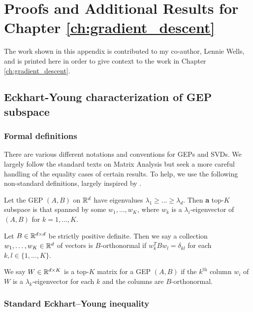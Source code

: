 \graphicspath{{chapters/gradient_descent/}}
\chapter{Proofs and Additional Results for Chapter \ref{ch:gradient_descent}}\label{app:gradient_descent}

The work shown in this appendix is contributed to my co-author, Lennie Wells, and is printed here in order to give context to the work in Chapter \ref{ch:gradient_descent}.

\section{Eckhart-Young characterization of GEP subspace}\label{supp:proofs}
\subsection{Formal definitions}
There are various different notations and conventions for GEPs and SVDs.
We largely follow the standard texts on Matrix Analysis \citep{stewart_matrix_1990,bhatiamatrix1997} but seek a more careful handling of the equality cases of certain results.
To help, we use the following non-standard definitions, largely inspired by \citet{carlssonvon2021}.

\begin{definition}
    Let the GEP $(A,B)$ on $\mathbb{R}^d$ have eigenvalues $\lambda_1 \geq \dots \geq \lambda_d$. Then \textbf{a} top-$K$ subspace is that spanned by some $w_1,\dots,w_K$, where $w_k$ is a $\lambda_i$-eigenvector of $(A,B)$ for $k=1,\dots,K$.
\end{definition}

\begin{definition}[$B$-orthonormality]
    Let $B \in \mathbb{R}^{d \times d}$ be strictly positive definite. Then we say a collection $w_1,\dots,w_K \in \mathbb{R}^{d}$ of vectors is $B$-orthonormal if $w_k^T B w_l = \delta_{kl}$ for each $k,l \in \{1,\dots,K\}$.
\end{definition}

\begin{definition}
    We say $W \in \mathbb{R}^{d \times K}$ is a top-$K$ matrix for a GEP $(A,B)$ if the $k^{\text{th}}$ column $w_i$ of $W$ is a $\lambda_k$-eigenvector for each $k$ and the columns are $B$-orthonormal.
\end{definition}


\subsection{Standard Eckhart--Young inequality}

